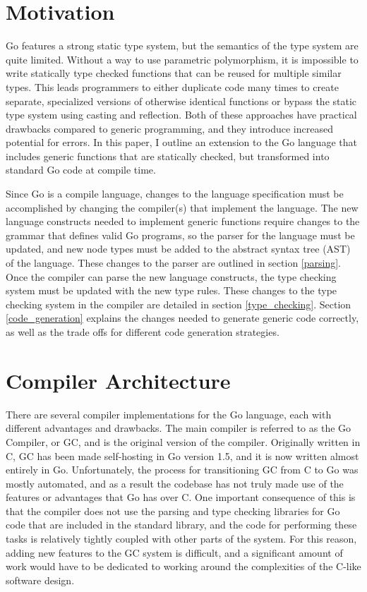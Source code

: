 \documentclass[letterpaper,twocolumn,11pt]{article}
\begin{document}
\section{Motivation} \label{motivation}

Go features a strong static type system, but the semantics of the type system are quite limited. Without a way to use parametric polymorphism, it is impossible to write statically type checked functions that can be reused for multiple similar types. This leads programmers to either duplicate code many times to create separate, specialized versions of otherwise identical functions or bypass the static type system using casting and reflection. Both of these approaches have practical drawbacks compared to generic programming, and they introduce increased potential for errors. In this paper, I outline an extension to the Go language that includes generic functions that are statically checked, but transformed into standard Go code at compile time. 

Since Go is a compile language, changes to the language specification must be accomplished by changing the compiler(s) that implement the language. The new language constructs needed to implement generic functions require changes to the grammar that defines valid Go programs, so the parser for the language must be updated, and new node types must be added to the abstract syntax tree (AST) of the language. These changes to the parser are outlined in section \ref{parsing}. Once the compiler can parse the new language constructs, the type checking system must be updated with the new type rules. These changes to the type checking system in the compiler are detailed in section \ref{type_checking}. Section \ref{code_generation} explains the changes needed to generate generic code correctly, as well as the trade offs for different code generation strategies. 

\section{Compiler Architecture} \label{architecture}

There are several compiler implementations for the Go language, each with different advantages and drawbacks. The main compiler is referred to as the Go Compiler, or GC, and is the original version of the compiler. Originally written in C, GC has been made self-hosting in Go version 1.5, and it is now written almost entirely in Go. Unfortunately, the process for transitioning GC from C to Go was mostly automated, and as a result the codebase has not truly made use of the features or advantages that Go has over C. One important consequence of this is that the compiler does not use the parsing and type checking libraries for Go code that are included in the standard library, and the code for performing these tasks is relatively tightly coupled with other parts of the system. For this reason, adding new features to the GC system is difficult, and a significant amount of work would have to be dedicated to working around the complexities of the C-like software design.
\end{document}
